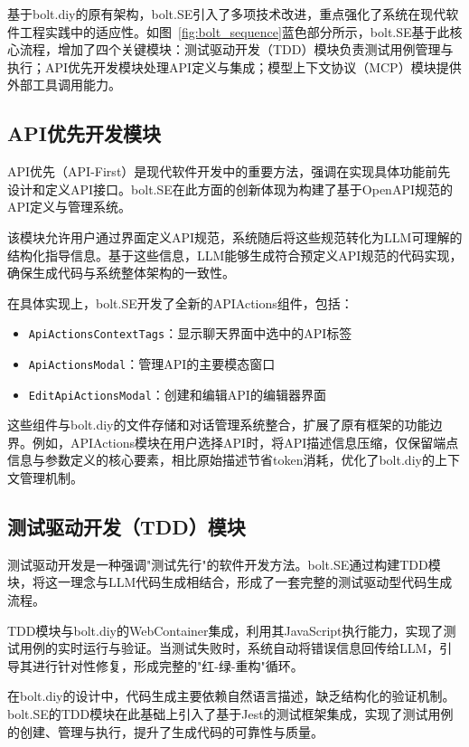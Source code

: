 基于bolt.diy的原有架构，bolt.SE引入了多项技术改进，重点强化了系统在现代软件工程实践中的适应性。如图~\ref{fig:bolt_sequence}蓝色部分所示，bolt.SE基于此核心流程，增加了四个关键模块：测试驱动开发（TDD）模块负责测试用例管理与执行；API优先开发模块处理API定义与集成；模型上下文协议（MCP）模块提供外部工具调用能力。

\subsection{API优先开发模块}
API优先（API-First）是现代软件开发中的重要方法，强调在实现具体功能前先设计和定义API接口。bolt.SE在此方面的创新体现为构建了基于OpenAPI规范的API定义与管理系统。

该模块允许用户通过界面定义API规范，系统随后将这些规范转化为LLM可理解的结构化指导信息。基于这些信息，LLM能够生成符合预定义API规范的代码实现，确保生成代码与系统整体架构的一致性。

在具体实现上，bolt.SE开发了全新的APIActions组件，包括：
\begin{itemize}
  \item \texttt{ApiActionsContextTags}：显示聊天界面中选中的API标签
  \item \texttt{ApiActionsModal}：管理API的主要模态窗口
  \item \texttt{EditApiActionsModal}：创建和编辑API的编辑器界面
\end{itemize}

这些组件与bolt.diy的文件存储和对话管理系统整合，扩展了原有框架的功能边界。例如，APIActions模块在用户选择API时，将API描述信息压缩，仅保留端点信息与参数定义的核心要素，相比原始描述节省token消耗，优化了bolt.diy的上下文管理机制。

\subsection{测试驱动开发（TDD）模块}

测试驱动开发是一种强调"测试先行"的软件开发方法。bolt.SE通过构建TDD模块，将这一理念与LLM代码生成相结合，形成了一套完整的测试驱动型代码生成流程。

TDD模块与bolt.diy的WebContainer集成，利用其JavaScript执行能力，实现了测试用例的实时运行与验证。当测试失败时，系统自动将错误信息回传给LLM，引导其进行针对性修复，形成完整的"红-绿-重构"循环。

在bolt.diy的设计中，代码生成主要依赖自然语言描述，缺乏结构化的验证机制。bolt.SE的TDD模块在此基础上引入了基于Jest的测试框架集成，实现了测试用例的创建、管理与执行，提升了生成代码的可靠性与质量。

